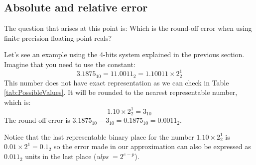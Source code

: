 


        \subsection{Absolute and relative error}


The question that arises at this point is: Which is the round-off error when using finite precision floating-point reals?

Let's see an example using the 4-bits system explained in the previous section. Imagine that you need to use the constant: 
$$
3.1875_{10} = 11.0011_2 = 1.10011\times 2^1_2
$$
This number does not have exact representation as we can check in Table \ref{tab:PossibleValues}. It will be rounded to the nearest representable number, which is: 
$$
1.10\times2^1_2 = 3_{10}
$$
The round-off error is $3.1875_{10} - 3_{10} = 0.1875_{10} = 0.0011_2$.
 
Notice that the last representable binary place for the number $1.10\times2^1_2$ is $0.01\times2^1 = 0.1_2$ 
so the error made in our approximation can also be expressed as $0.011_2$ units in the last place (\textit{ulps} $= 2^{e-p}$). 



